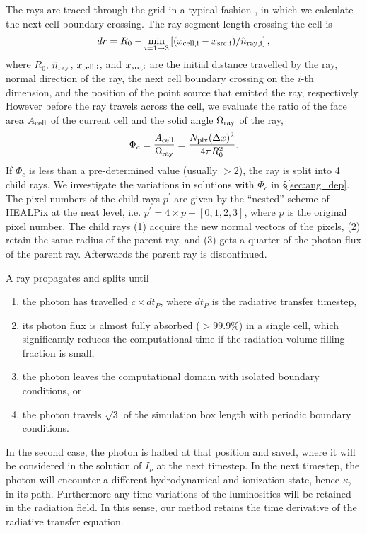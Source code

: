 \documentclass[apj,onecolumn]{emulateapj}
\begin{document}
The rays are traced through the grid in a typical fashion
\citep[e.g.][]{Abel99_RT}, in which we calculate the next cell
boundary crossing.  The ray segment length crossing the cell is
%
\begin{equation}
  \label{eqn:trace}
  dr = R_0 - \min_{i=1 \rightarrow 3} \left[(x_{\rm cell,i} - x_{\rm src,i}) /
    \hat{n}_{\rm ray,i} \right],
\end{equation}
%
where $R_0$, $\hat{n}_{\rm ray}$, $x_{\rm cell,i}$, and $x_{\rm
  src,i}$ are the initial distance travelled by the ray, normal
direction of the ray, the next cell boundary crossing on the $i$-th
dimension, and the position of the point source that emitted the ray,
respectively.  However before the ray travels across the cell, we
evaluate the ratio of the face area $A_{\rm cell}$ of the current cell
and the solid angle $\Omega_{\rm ray}$ of the ray,
%
\begin{equation}
  \label{eqn:split}
  \Phi_c = \frac{A_{\rm cell}} {\Omega_{\rm ray}} = 
  \frac{N_{\rm pix} (\Delta x)^2} {4\pi R_0^2}.
\end{equation}
%
If $\Phi_c$ is less than a pre-determined value (usually $>2$), the
ray is split into 4 child rays.  We investigate the variations in
solutions with $\Phi_c$ in \S\ref{sec:ang_dep}.  The pixel numbers
of the child rays $p^\prime$ are given by the ``nested'' scheme of
HEALPix at the next level, i.e. $p^\prime = 4 \times p + [0,1,2,3]$,
where $p$ is the original pixel number.  The child rays (1) acquire
the new normal vectors of the pixels, (2) retain the same radius of
the parent ray, and (3) gets a quarter of the photon flux of the
parent ray.  Afterwards the parent ray is discontinued.

A ray propagates and splits until 
%
\begin{enumerate}
\item the photon has travelled $c \times dt_P$, where $dt_P$ is the
  radiative transfer timestep,
\item its photon flux is almost fully absorbed ($>99.9\%$) in a single
  cell, which significantly reduces the computational time if the
  radiation volume filling fraction is small,
\item the photon leaves the computational domain with isolated
  boundary conditions, or
\item the photon travels $\sqrt{3}$ of the simulation box length with
  periodic boundary conditions.
\end{enumerate}
%
In the second case, the photon is halted at that position and saved,
where it will be considered in the solution of $I_\nu$ at the next
timestep.  In the next timestep, the photon will encounter a different
hydrodynamical and ionization state, hence $\kappa$, in its path.
Furthermore any time variations of the luminosities will be retained
in the radiation field.  In this sense, our method retains the time
derivative of the radiative transfer equation.
\end{document}
